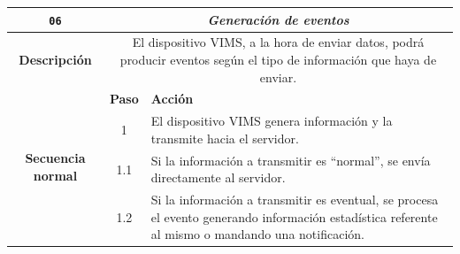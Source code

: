 \begin{table}[H]
  \centering
  \begin{tabularx}{\textwidth}{|c|c|X|}
    \hline
    \texttt{06}                                & \multicolumn{2}{c|}{\textit{Generación de eventos}}                                                                                                                                                                                                                                                                         \\
    \hline
    \textbf{Descripción}                       & \multicolumn{2}{X|}{El dispositivo \ac{VIMS}, a la hora de enviar datos, podrá producir eventos según el tipo de información que haya de enviar.}                                                                                                                                                                           \\
    \hline
    \multirow{10}{*}{\textbf{Secuencia normal}} & \textbf{Paso}                                                                                                                                     & \textbf{Acción}                                                                                                                                                         \\
    \cline{2-3}
                                               & 1                                                                                                                                                 & \multicolumn{1}{L|}{El dispositivo \ac{VIMS} genera información y la transmite hacia el servidor.}                                                                      \\
    \cline{2-3}
                                               & 1.1                                                                                                                                               & \multicolumn{1}{L|}{Si la información a transmitir es ``normal'', se envía directamente al servidor.}                                                                   \\
    \cline{2-3}
                                               & 1.2                                                                                                                                               & \multicolumn{1}{L|}{Si la información a transmitir es eventual, se procesa el evento generando información estadística referente al mismo o mandando una notificación.} \\

\end{tabularx}
\end{table}
